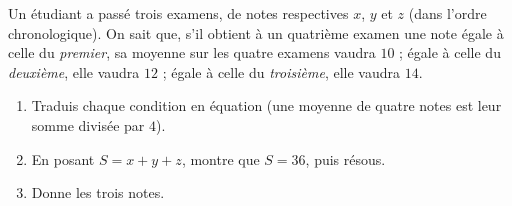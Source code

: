 \documentclass[11pt,a4paper]{article}
\begin{document}
\begin{exo}
Un étudiant a passé trois examens, de notes respectives $x$, $y$ et $z$ (dans l'ordre chronologique).
On sait que, s'il obtient à un quatrième examen une note égale à celle du \emph{premier}, sa moyenne
sur les quatre examens vaudra $10$ ; égale à celle du \emph{deuxième}, elle vaudra $12$ ; égale à
celle du \emph{troisième}, elle vaudra $14$.
\begin{enumerate}[label=\textbf{\alph*)},leftmargin=2.2em,topsep=1pt,itemsep=2pt]
  \item Traduis chaque condition en équation (une moyenne de quatre notes est leur somme divisée par $4$).
  \item En posant $S=x+y+z$, montre que $S=36$, puis résous.
  \item Donne les trois notes.
\end{enumerate}
\end{exo}
\end{document}
